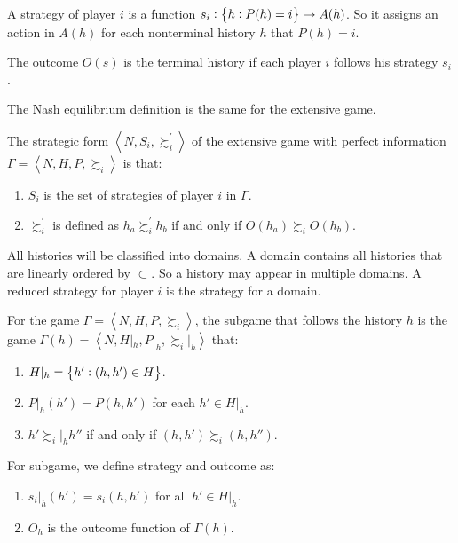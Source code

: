 \begin{definition}
    A strategy of player $i$ is a function $s_i: \set{h: P(h) = i} \rightarrow A(h)$. So it assigns an action in $A(h)$ for each nonterminal history $h$ that $P(h) = i$.
\end{definition}

\begin{definition}
    The outcome $O(s)$ is the terminal history if each player $i$ follows his strategy $s_i$.
\end{definition}

The Nash equilibrium definition is the same for the extensive game.

\begin{definition}
    The strategic form $\left\langle N, S_i, \succsim_i^{'} \right\rangle$ of the extensive game with perfect information $\Gamma = \left\langle N, H, P, \succsim_i \right\rangle$ is that:
    \begin{enumerate}
        \item $S_i$ is the set of strategies of player $i$ in $\Gamma$.
        \item $\succsim_i^{'}$ is defined as $h_a \succsim_i^{'} h_b$ if and only if $O(h_a) \succsim_i O(h_b)$.
    \end{enumerate}
\end{definition}

\begin{definition}
    All histories will be classified into domains. A domain contains all histories that are linearly ordered by $\subset$. So a history may appear in multiple domains. A reduced strategy for player $i$ is the strategy for a domain. 
\end{definition}

\begin{definition}
    For the game $\Gamma = \left\langle N, H, P, \succsim_i \right\rangle$, the subgame that follows the history $h$ is the game $\Gamma(h) = \left\langle N, H|_h, P|_h, \succsim_i|_h \right\rangle$ that:
    \begin{enumerate}
        \item $H|_h = \set{h': (h, h') \in H}$.
        \item $P|_h(h') = P(h, h')$ for each $h' \in H|_h$.
        \item $h' \succsim_i|_h h''$ if and only if $(h, h') \succsim_i (h, h'')$.
    \end{enumerate}
    
    For subgame, we define strategy and outcome as:
    \begin{enumerate}
        \item $s_i |_h(h') = s_i (h,h')$ for all $h' \in H|_h$.
        \item $O_h$ is the outcome function of $\Gamma(h)$.
    \end{enumerate}
\end{definition}


